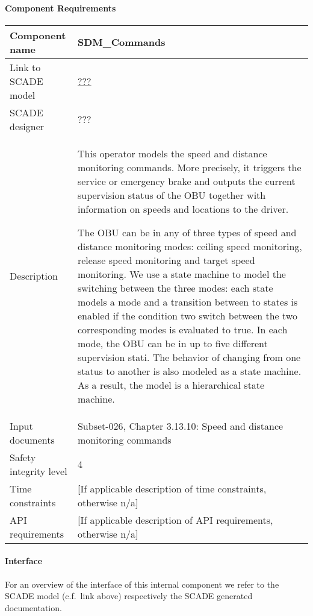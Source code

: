 
\paragraph{Component Requirements}

\begin{longtable}{p{}p{}}
\toprule
Component name			& SDM\_Commands \\
\midrule
Link to SCADE model		& {\footnotesize \url{???}} \\
\midrule
SCADE designer			& ??? \\
\midrule
Description				& This operator models the speed and distance monitoring commands. More precisely, it triggers the service or emergency brake and outputs the current supervision status of the OBU together with information on speeds and locations to the driver.

The OBU can be in any of three types of speed and distance monitoring modes: ceiling speed monitoring, release speed monitoring and target speed monitoring. We use a state machine to model the switching between the three modes: each state models a mode and a transition between to states is enabled if the condition two switch between the two corresponding modes is evaluated to true. In each mode, the OBU can be in up to five different supervision stati. The behavior of changing from one status to another is also modeled as a state machine. As a result, the model is a hierarchical state machine.\\
\midrule
Input documents	& 
Subset-026, Chapter 3.13.10: Speed and distance monitoring commands \\
\midrule
Safety integrity level		& 4 \\
\midrule
Time constraints		& [If applicable description of time constraints, otherwise n/a] \\
\midrule
API requirements 		& [If applicable description of API requirements, otherwise n/a] \\
\bottomrule
\end{longtable}


\paragraph{Interface}

For an overview of the interface of this internal component we refer to the SCADE model (c.f.~link above) respectively the SCADE generated documentation.